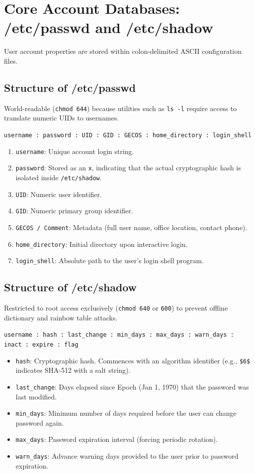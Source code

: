 \section{Core Account Databases: /etc/passwd and /etc/shadow}
User account properties are stored within colon-delimited ASCII configuration files.

\subsection{Structure of /etc/passwd}
World-readable (\texttt{chmod 644}) because utilities such as \texttt{ls -l} require access to translate numeric UIDs to usernames.
\begin{center}
\texttt{username : password : UID : GID : GECOS : home\_directory : login\_shell}
\end{center}
\begin{enumerate}[leftmargin=1.5em]
    \item \texttt{username}: Unique account login string.
    \item \texttt{password}: Stored as an \texttt{x}, indicating that the actual cryptographic hash is isolated inside \texttt{/etc/shadow}.
    \item \texttt{UID}: Numeric user identifier.
    \item \texttt{GID}: Numeric primary group identifier.
    \item \texttt{GECOS / Comment}: Metadata (full user name, office location, contact phone).
    \item \texttt{home\_directory}: Initial directory upon interactive login.
    \item \texttt{login\_shell}: Absolute path to the user's login shell program.
\end{enumerate}

\subsection{Structure of /etc/shadow}
Restricted to root access exclusively (\texttt{chmod 640} or \texttt{600}) to prevent offline dictionary and rainbow table attacks.
\begin{center}
\texttt{username : hash : last\_change : min\_days : max\_days : warn\_days : inact : expire : flag}
\end{center}
\begin{itemize}[leftmargin=1.5em]
    \item \texttt{hash}: Cryptographic hash. Commences with an algorithm identifier (e.g., \texttt{\$6\$} indicates SHA-512 with a salt string).
    \item \texttt{last\_change}: Days elapsed since Epoch (Jan 1, 1970) that the password was last modified.
    \item \texttt{min\_days}: Minimum number of days required before the user can change password again.
    \item \texttt{max\_days}: Password expiration interval (forcing periodic rotation).
    \item \texttt{warn\_days}: Advance warning days provided to the user prior to password expiration.
\end{itemize}

